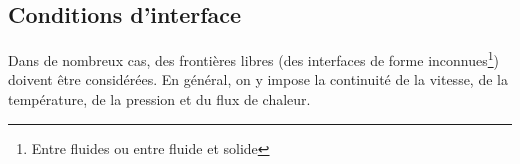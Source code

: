 \documentclass[a4paper,11pt]{report}
\begin{document}
    \subsection{Conditions d'interface}
      Dans de nombreux cas, des frontières libres (des interfaces de forme inconnues\footnote{Entre fluides ou entre fluide et solide}) doivent être considérées. En général, on y impose la continuité de la vitesse, de la température, de la pression et du flux de chaleur. 




\begin{appendix}
  
\end{appendix}
\end{document}
